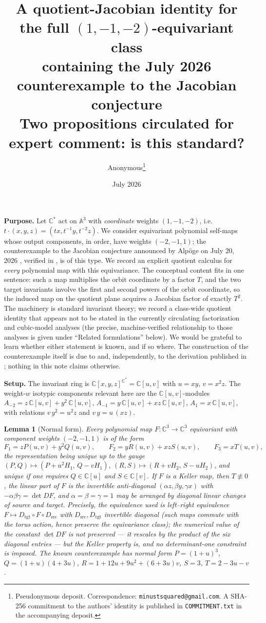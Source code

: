 \documentclass[11pt]{article}
\title{A quotient-Jacobian identity for the full $(1,-1,-2)$-equivariant class\\ containing the July 2026 counterexample to the Jacobian conjecture\\[2mm]
\large Two propositions circulated for expert comment: is this standard?}
\author{Anonymous\thanks{Pseudonymous deposit.
Correspondence: \texttt{minustsquared@gmail.com}. A SHA-256 commitment to
the authors' identity is published in \texttt{COMMITMENT.txt} in the
accompanying deposit.}}
\date{July 2026}
\newtheorem{lemma}{Lemma}
\newcommand{\C}{\mathbb{C}}
\begin{document}
\maketitle

\noindent\textbf{Purpose.} Let $\C^{*}$ act on $\mathbb{A}^{3}$ with
\emph{coordinate} weights $(1,-1,-2)$, i.e.\
$t\cdot(x,y,z)=(tx,t^{-1}y,t^{-2}z)$. We consider equivariant polynomial
self-maps whose output components, in order, have weights $(-2,-1,1)$; the
counterexample to the Jacobian conjecture announced by Alp\"oge on July 20,
2026 \cite{alpoge2026}, verified in \cite{ulam2026}, is of this type. We
record an explicit quotient calculus for \emph{every} polynomial map with
this equivariance. The conceptual content fits in one sentence: such a map
multiplies the orbit coordinate by a factor $T$, and the two target
invariants involve the first and second powers of the orbit coordinate, so
the induced map on the quotient plane acquires a Jacobian factor of exactly
$T^{2}$. The machinery is standard invariant theory; we record a class-wide
quotient identity that appears not to be stated in the currently circulating
factorization and cubic-model analyses (the precise, machine-verified
relationship to those analyses is given under ``Related formulations''
below). We would be grateful to learn whether either statement
is known, and if so where. The construction of the counterexample itself is
due to \cite{alpoge2026} and, independently, to the derivation published in
\cite{lou2026}; nothing in this note claims otherwise.

\medskip
\noindent\textbf{Setup.} The invariant ring is $\C[x,y,z]^{\C^*}=\C[u,v]$ with
$u=xy$, $v=x^2z$. The weight-$w$ isotypic components relevant here are the
$\C[u,v]$-modules
$A_{-2}=z\,\C[u,v]+y^2\,\C[u,v]$, $A_{-1}=y\,\C[u,v]+xz\,\C[u,v]$,
$A_{1}=x\,\C[u,v]$, with relations $v\,y^2=u^2 z$ and $v\,y=u\,(xz)$.

\begin{lemma}[Normal form]
Every polynomial map $F:\C^3\to\C^3$ equivariant with component weights $(-2,-1,1)$
is of the form
\[
F_1=zP(u,v)+y^2Q(u,v),\qquad F_2=yR(u,v)+xzS(u,v),\qquad F_3=xT(u,v),
\]
the representation being unique up to the gauge
$(P,Q)\mapsto(P+u^2H_1,\,Q-vH_1)$, $(R,S)\mapsto(R+vH_2,\,S-uH_2)$, and unique
if one requires $Q\in\C[u]$ and $S\in\C[v]$. If $F$ is a Keller map, then $T\not\equiv0$, the
linear part of $F$ is the invertible anti-diagonal $(\alpha z,\beta y,\gamma x)$
with $-\alpha\beta\gamma=\det DF$, and $\alpha=\beta=\gamma=1$ may be arranged by
diagonal linear changes of source and target. Precisely, the equivalence used is
left--right equivalence $F\mapsto D_{\mathrm{tgt}}\circ F\circ D_{\mathrm{src}}$
with $D_{\mathrm{src}},D_{\mathrm{tgt}}$ invertible diagonal (such maps commute
with the torus action, hence preserve the equivariance class); the numerical
value of the constant $\det DF$ is \emph{not} preserved --- it rescales by the
product of the six diagonal entries --- but the Keller property is, and no
determinant-one constraint is imposed. The known counterexample has normal form
$P=(1+u)^3$, $Q=(1+u)(4+3u)$, $R=1+12u+9u^2+(6+3u)v$, $S=3$, $T=2-3u-v$.
\end{lemma}
\end{document}
